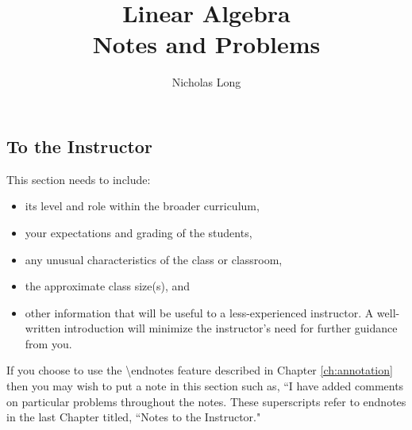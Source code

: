 

\usepackage[all]{xy}
\usepackage{color,graphicx}
%
\InstructorVersion
%
\newcommand\Rn{$\mathbb{R}^n$}
\newcommand\Rm{$\mathbb{R}^m$}
\newcommand\R{$\mathbb{R}$}
\newcommand\bq{\begin{question}}
\newcommand\eq{\end{question}}
\newcommand\be{\begin{enumerate}}
\newcommand\ee{\end{enumerate}}
\newtheorem{question}[theorem]{Question}
\renewcommand{\labelenumi}{\alph{enumi})}
\newcount\colveccount
\newcommand*\colvec[1]{
        \global\colveccount#1
        \begin{bmatrix}
        \colvecnext
}
\def\colvecnext#1{
        #1
        \global\advance\colveccount-1
        \ifnum\colveccount>0
                \\
                \expandafter\colvecnext
        \else
                \end{bmatrix}
        \fi
}


\large
\frontmatter
\title{Linear Algebra \\
Notes and Problems}
\author{Nicholas Long}
\maketitle
\tableofcontents

\begin{annotation}
\chapter{To the Instructor}
This section needs to include:
\begin{itemize}
\item  its level and role within the broader curriculum,
\item  your expectations and grading of the students,
\item  any unusual characteristics of the class or classroom,
\item  the approximate class size(s), and
\item other information that will be useful to a less-experienced instructor.
A well-written introduction will minimize the instructor's need for further guidance from you.
\end{itemize}

If you choose to use the \textbackslash endnotes feature described in Chapter \ref{ch:annotation} then
you may wish to put a note in this section such as, ``I have added comments on particular problems
throughout the notes.  These superscripts refer to endnotes in the last Chapter titled,
``Notes to the Instructor."
\end{annotation}

